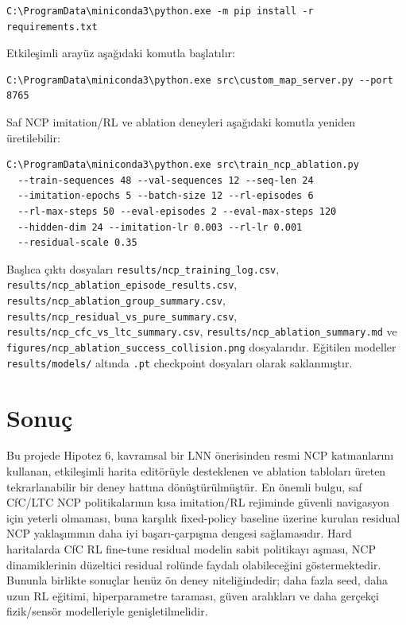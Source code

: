 \documentclass[11pt,a4paper]{article}
\begin{document}
\begin{verbatim}
C:\ProgramData\miniconda3\python.exe -m pip install -r requirements.txt
\end{verbatim}

Etkileşimli arayüz aşağıdaki komutla başlatılır:

\begin{verbatim}
C:\ProgramData\miniconda3\python.exe src\custom_map_server.py --port 8765
\end{verbatim}

Saf NCP imitation/RL ve ablation deneyleri aşağıdaki komutla yeniden üretilebilir:

\begin{verbatim}
C:\ProgramData\miniconda3\python.exe src\train_ncp_ablation.py
  --train-sequences 48 --val-sequences 12 --seq-len 24
  --imitation-epochs 5 --batch-size 12 --rl-episodes 6
  --rl-max-steps 50 --eval-episodes 2 --eval-max-steps 120
  --hidden-dim 24 --imitation-lr 0.003 --rl-lr 0.001
  --residual-scale 0.35
\end{verbatim}

Başlıca çıktı dosyaları \texttt{results/ncp\_training\_log.csv}, \texttt{results/ncp\_ablation\_episode\_results.csv}, \texttt{results/ncp\_ablation\_group\_summary.csv}, \texttt{results/ncp\_residual\_vs\_pure\_summary.csv}, \texttt{results/ncp\_cfc\_vs\_ltc\_summary.csv}, \texttt{results/ncp\_ablation\_summary.md} ve \texttt{figures/ncp\_ablation\_success\_collision.png} dosyalarıdır. Eğitilen modeller \texttt{results/models/} altında \texttt{.pt} checkpoint dosyaları olarak saklanmıştır.

\section{Sonuç}

Bu projede Hipotez 6, kavramsal bir LNN önerisinden resmi NCP katmanlarını kullanan, etkileşimli harita editörüyle desteklenen ve ablation tabloları üreten tekrarlanabilir bir deney hattına dönüştürülmüştür. En önemli bulgu, saf CfC/LTC NCP politikalarının kısa imitation/RL rejiminde güvenli navigasyon için yeterli olmaması, buna karşılık fixed-policy baseline üzerine kurulan residual NCP yaklaşımının daha iyi başarı-çarpışma dengesi sağlamasıdır. Hard haritalarda CfC RL fine-tune residual modelin sabit politikayı aşması, NCP dinamiklerinin düzeltici residual rolünde faydalı olabileceğini göstermektedir. Bununla birlikte sonuçlar henüz ön deney niteliğindedir; daha fazla seed, daha uzun RL eğitimi, hiperparametre taraması, güven aralıkları ve daha gerçekçi fizik/sensör modelleriyle genişletilmelidir.
\end{document}
